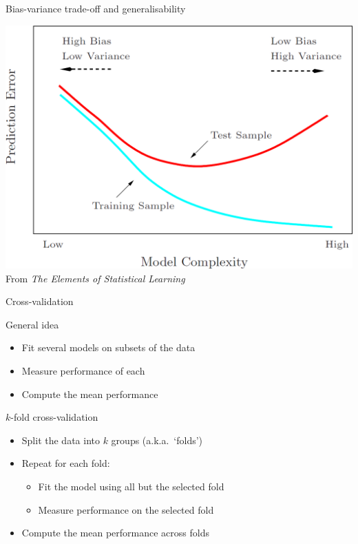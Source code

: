 \begin{frame}{Bias\hyp{}variance trade\hyp{}off and generalisability}
    \begin{center}
        \includegraphics[height=0.8\textheight]{figures/generalisability} \\
        {\scriptsize%
         From \textit{The Elements of Statistical Learning}}
    \end{center}
\end{frame}

\begin{frame}{Cross\hyp{}validation}
    \begin{block}{General idea}
        \begin{itemize}
            \item Fit several models on subsets of the data
            \item Measure performance of each
            \item Compute the mean performance
        \end{itemize}
    \end{block}
\end{frame}

\begin{frame}{$k$-fold cross\hyp{}validation}
    \begin{itemize}
        \item Split the data into $k$ groups (a.k.a.\ `folds')
        \item Repeat for each fold:
              \begin{itemize}
                  \item Fit the model using all but the selected fold
                  \item Measure performance on the selected fold
              \end{itemize}
        \item Compute the mean performance across folds
    \end{itemize}
\end{frame}

